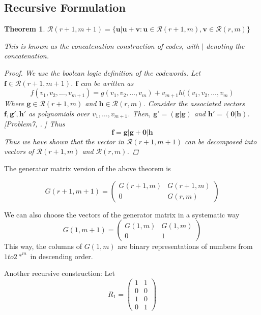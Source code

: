 \documentclass{article}
\newcommand{\RM}[2]{\ensuremath{\mathcal{R}(#1,#2)}}
\newcommand{\V}[1]{\ensuremath{\mathbf{#1}}}
\theoremstyle{plain}
\newtheorem{thm}{Theorem}
\begin{document}
\subsection{Recursive Formulation}
\label{recursive}
\begin{thm}
$\RM{r+1}{m+1} =  \{ \V{u} | \V{u}+\V{v} : \V{u} \in \RM{r+1}{m}, \V{v} \in \RM{r}{m} \}$


This is known as the concatenation construction of codes, with $|$ denoting the concatenation.

\begin{proof} We use the boolean logic definition of the codewords.
Let $\V{f} \in \RM{r+1}{m+1}$.  $\V{f}$ can be written as \begin{equation*}
f(v_1,v_2,\ldots,v_{m+1}) = g(v_1,v_2,\ldots,v_m)+v_{m+1}h((v_1,v_2,\ldots,v_{m})
\end{equation*}
Where $\V{g} \in \RM{r+1}{m} $ and $\V{h} \in \RM{r}{m}$. Consider the associated vectors $\V{f}, \V{g'}, \V{h'}$ as polynomials over $v_1,\ldots,v_{m+1}$. 
Then, $\V{g'} = (\V{g}|\V{g})$ and $\V{h'} = (\V{0}|\V{h})$. [Problem7, \cite{sloane}. ]
Thus
\begin{equation*}
  \V{f} = \V{g}|\V{g} + \V{0}|\V{h}
\end{equation*}
Thus we have shown that the vector in $\RM{r+1}{m+1}$ can be decomposed into vectors of $\RM{r+1}{m}$ and $\RM{r}{m}$.
\end{proof}

\end{thm}
The generator matrix version of the above theorem is

\begin{equation}
G(r+1,m+1) = \begin{pmatrix}
G(r+1,m) & G(r+1,m) \\
0 & G(r,m) 
\end{pmatrix}
\end{equation}

We can also choose the vectors of the generator matrix in a systematic way \begin{equation}
G(1,m+1) = \begin{pmatrix}
G(1,m) & G(1,m) \\
0 & 1
\end{pmatrix}
\end{equation}
This way, the columns of $G(1,m)$ are binary representations of numbers from $1 to 2*^m$ in descending order.




Another recursive construction:
Let 
\begin{equation*}
R_1 = \begin{pmatrix}
1 & 1 \\
0 & 0 \\
1 & 0 \\
0 & 1 
\end{pmatrix}
\end{equation*}
\end{document}

